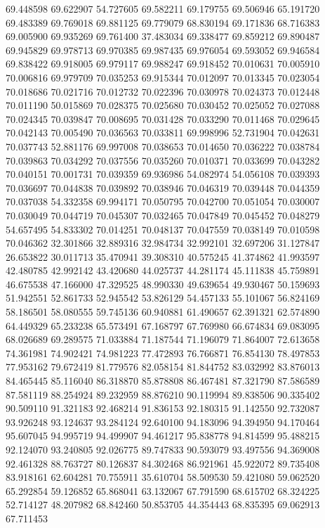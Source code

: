 69.448598
69.622907
54.727605
69.582211
69.179755
69.506946
65.191720
69.483389
69.769018
69.881125
69.779079
68.830194
69.171836
68.716383
69.005900
69.935269
69.761400
37.483034
69.338477
69.859212
69.890487
69.945829
69.978713
69.970385
69.987435
69.976054
69.593052
69.946584
69.838422
69.918005
69.979117
69.988247
69.918452
70.010631
70.005910
70.006816
69.979709
70.035253
69.915344
70.012097
70.013345
70.023054
70.018686
70.021716
70.012732
70.022396
70.030978
70.024373
70.012448
70.011190
50.015869
70.028375
70.025680
70.030452
70.025052
70.027088
70.024345
70.039847
70.008695
70.031428
70.033290
70.011468
70.029645
70.042143
70.005490
70.036563
70.033811
69.998996
52.731904
70.042631
70.037743
52.881176
69.997008
70.038653
70.014650
70.036222
70.038784
70.039863
70.034292
70.037556
70.035260
70.010371
70.033699
70.043282
70.040151
70.001731
70.039359
69.936986
54.082974
54.056108
70.039393
70.036697
70.044838
70.039892
70.038946
70.046319
70.039448
70.044359
70.037038
54.332358
69.994171
70.050795
70.042700
70.051054
70.030007
70.030049
70.044719
70.045307
70.032465
70.047849
70.045452
70.048279
54.657495
54.833302
70.014251
70.048137
70.047559
70.038149
70.010598
70.046362
32.301866
32.889316
32.984734
32.992101
32.697206
31.127847
26.653822
30.011713
35.470941
39.308310
40.575245
41.374862
41.993597
42.480785
42.992142
43.420680
44.025737
44.281174
45.111838
45.759891
46.675538
47.166000
47.329525
48.990330
49.639654
49.930467
50.159693
51.942551
52.861733
52.945542
53.826129
54.457133
55.101067
56.824169
58.186501
58.080555
59.745136
60.940881
61.490657
62.391321
62.574890
64.449329
65.233238
65.573491
67.168797
67.769980
66.674834
69.083095
68.026689
69.289575
71.033884
71.187544
71.196079
71.864007
72.613658
74.361981
74.902421
74.981223
77.472893
76.766871
76.854130
78.497853
77.953162
79.672419
81.779576
82.058154
81.844752
83.032992
83.876013
84.465445
85.116040
86.318870
85.878808
86.467481
87.321790
87.586589
87.581119
88.254924
89.232959
88.876210
90.119994
89.838506
90.335402
90.509110
91.321183
92.468214
91.836153
92.180315
91.142550
92.732087
93.926248
93.124637
93.284124
92.640100
94.183096
94.394950
94.170464
95.607045
94.995719
94.499907
94.461217
95.838778
94.814599
95.488215
92.124070
93.240805
92.026775
89.747833
90.593079
93.497556
94.369008
92.461328
88.763727
80.126837
84.302468
86.921961
45.922072
89.735408
83.918161
62.604281
70.755911
35.610704
58.509530
59.421080
59.062520
65.292854
59.126852
65.868041
63.132067
67.791590
68.615702
68.324225
52.714127
48.207982
68.842460
50.853705
44.354443
68.835395
69.062913
67.711453
